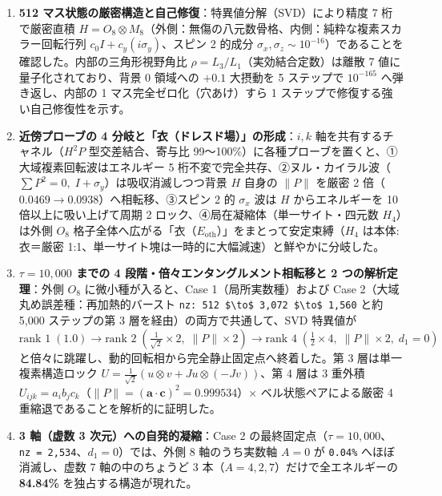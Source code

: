 \documentclass[
  a4paper,
]{ltjsarticle}
\providecommand{\tightlist}{%
  \setlength{\itemsep}{0pt}\setlength{\parskip}{0pt}}
\begin{document}
\begin{enumerate}
\def\labelenumi{\arabic{enumi}.}
\tightlist
\item
  \textbf{512 マス状態の厳密構造と自己修復}：特異値分解（SVD）により精度
  7 桁で厳密直積
  \(H = O_8 \otimes M_8\)（外側：無傷の八元数骨格、内側：純粋な複素スカラー回転行列
  \(c_0 I + c_y(i\sigma_y)\)、スピン 2 的成分
  \(\sigma_x, \sigma_z \sim 10^{-16}\)）であることを確認した。内部の三角形視野角比
  \(\rho = L_3/L_1\)（実効結合定数）は離散 7 値に量子化されており、背景
  0 領域への \(+0.1\) 大摂動を 5 ステップで \(10^{-165}\)
  へ弾き返し、内部の 1 マス完全ゼロ化（穴あけ）すら 1
  ステップで修復する強い自己修復性を示す。
\item
  \textbf{近傍プローブの 4 分岐と「衣（ドレスド場）」の形成}：\(i, k\)
  軸を共有するチャネル（\(H^2 P\) 型交差結合、寄与比
  99〜100\%）に各種プローブを置くと、①大域複素回転波はエネルギー 5
  桁不変で完全共存、②ヌル・カイラル波（\(\sum P^2 = 0,\; I+\sigma_y\)）は吸収消滅しつつ背景
  \(H\) 自身の \(\|P\|\) を厳密 2
  倍（\(0.0469 \to 0.0938\)）へ相転移、③スピン 2 的 \(\sigma_x\) 波は
  \(H\) からエネルギーを 10 倍以上に吸い上げて周期 2
  ロック、④局在凝縮体（単一サイト・四元数 \(H_4\)）は外側 \(O_8\)
  格子全体へ広がる「衣（\(E_{\mathrm{oth}}\)）」をまとって安定束縛（\(H_4\)
  は本体:衣＝厳密
  1:1、単一サイト塊は一時的に大幅減速）と鮮やかに分岐した。
\item
  \textbf{\(\tau = 10,000\) までの 4
  段階・倍々エンタングルメント相転移と 2 つの解析定理}：外側 \(O_8\)
  に微小種が入ると、Case 1（局所実数種）および Case
  2（大域丸め誤差種：再加熱的バースト
  \texttt{nz:\ 512\ \$\textbackslash{}to\$\ 3,072\ \$\textbackslash{}to\$\ 1,560}
  と約 5,000 ステップの第 3 層を経由）の両方で共通して、SVD 特異値が
  \(\text{rank } 1\;(1.0) \to \text{rank } 2\;(\frac{1}{\sqrt{2}}\times 2,\; \|P\|\times 2) \to \text{rank } 4\;(\frac{1}{2}\times 4,\; \|P\|\times 2,\; d_1=0)\)
  と倍々に跳躍し、動的回転相から完全静止固定点へ終着した。第 3
  層は単一複素構造ロック
  \(U = \frac{1}{\sqrt{2}}(u\otimes v + Ju\otimes(-Jv))\)、第 4 層は 3
  重外積
  \(U_{ijk} = a_i b_j c_k\)（\(\|P\| = (\mathbf{a}\cdot\mathbf{c})^2 = 0.999534\)）×
  ベル状態ペアによる厳密 4 重縮退であることを解析的に証明した。
\item
  \textbf{3 軸（虚数 3 次元）への自発的凝縮}：Case 2
  の最終固定点（\(\tau = 10,000\)、\texttt{nz\ =\ 2,534}、\(d_1 = 0\)）では、外側
  8 軸のうち実数軸 \(A=0\) が \texttt{0.04\%} へほぼ消滅し、虚数 7
  軸の中のちょうど 3 本（\(A = 4, 2, 7\)）だけで全エネルギーの
  \textbf{84.84\%} を独占する構造が現れた。
\end{enumerate}
\end{document}
